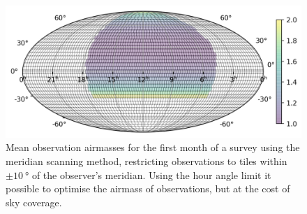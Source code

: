\begin{colsection}
\begin{figure}[p]
    \begin{center}
        \includegraphics[width=0.7\linewidth]{images/survey_sims/30_1N4_meridian_airmass.png}
    \end{center}
    \caption[Mean observation airmasses using the meridian scanning method]{
        Mean observation airmasses for the first month of a survey using the meridian scanning method, restricting observations to tiles within $\pm\SI{10}{\degree}$ of the observer's meridian. Using the hour angle limit it possible to optimise the airmass of observations, but at the cost of sky coverage.
    }\label{fig:survey_sim_airmass_meridian}
\end{figure}

\end{colsection}


